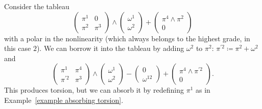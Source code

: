 \begin{example}
    Consider the tableau 
    \[\left(\begin{array}{cc}
        \boxed{\pi^1} & 0 \\
        \boxed{\pi^2} & \boxed{\pi^3}
    \end{array}\right)\wedge 
    \left(\begin{array}{c}
        \omega^1\\
        \omega^2
    \end{array}\right)+
    \left(\begin{array}{c}
        \boxed{\pi^4}\wedge\pi^2\\
        0
    \end{array}\right)
    \]
    with a polar in the nonlinearity (which always belongs to the highest grade, in this case $2$). We can borrow it into the tableau by adding $\omega^2$ to $\pi^2$: $\pi^{\prime 2}\coloneqq \pi^2+\omega^2$ and
    \[\left(\begin{array}{cc}
        \boxed{\pi^1} & \boxed{\pi^4} \\
        \boxed{\pi^{\prime 2}} & \boxed{\pi^3}
    \end{array}\right)\wedge 
    \left(\begin{array}{c}
        \omega^1\\
        \omega^2
    \end{array}\right)-
    \left(\begin{array}{c}
        0\\
        \omega^{12}
    \end{array}\right)+
    \left(\begin{array}{c}
        \pi^4\wedge\pi^{\prime 2}\\
        0
    \end{array}\right).
    \]
    This produces torsion, but we can absorb it by redefining $\pi^1$ as in Example~\ref{example absorbing torsion}.
\end{example}

